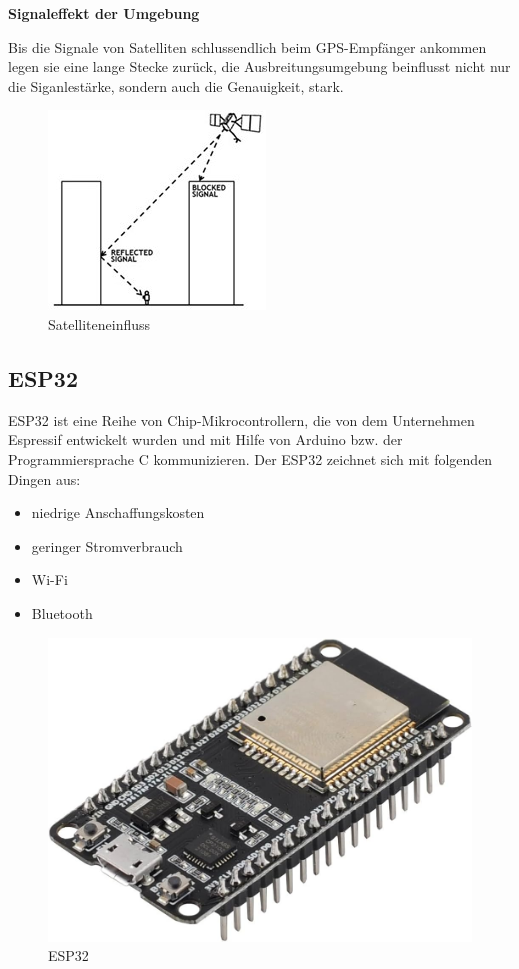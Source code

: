\textbf{Signaleffekt der Umgebung}


Bis die Signale von Satelliten schlussendlich beim GPS-Empfänger ankommen legen sie eine lange Stecke zurück, die Ausbreitungsumgebung beinflusst nicht nur die Siganlestärke, sondern auch die Genauigkeit, stark.
\begin{figure}[H]
	\centering
	\includegraphics[width=0.7\linewidth]{images/Satelliteneinfluss.jpg}
	\caption[Satelliteneinfluss]{Satelliteneinfluss}
	\label{fig:Satelliteneinfluss}
\end{figure}

\subsection{ESP32}

ESP32 ist eine Reihe von Chip-Mikrocontrollern, die von dem Unternehmen Espressif entwickelt wurden und mit Hilfe von Arduino bzw. der Programmiersprache C kommunizieren. Der ESP32 \textcite{ESP32} zeichnet sich mit folgenden Dingen aus:

\begin{itemize}
	\item niedrige Anschaffungskosten
	\item geringer Stromverbrauch
	\item Wi-Fi
	\item Bluetooth
\end{itemize}


\begin{figure}[H]
	\centering
	\includegraphics[width=0.7\linewidth]{images/ESP32.jpg}
	\caption[ESP32]{ESP32}
	\label{fig:ESP32}
\end{figure}

